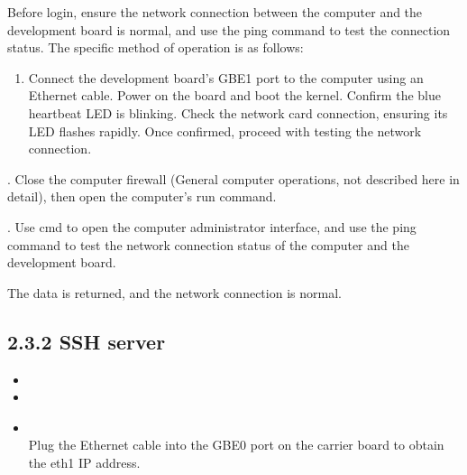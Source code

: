 \documentclass[letterpaper,10pt,openany,english]{sphinxmanual}
\begin{document}
\sphinxAtStartPar
Before login, ensure the network connection between the computer and the development board is normal, and use the ping command to test the connection status. The specific method of operation is as follows:
\begin{enumerate}
%
\item {} 
\sphinxAtStartPar
Connect the development board’s GBE1 port to the computer using an Ethernet cable. Power on the board and boot the kernel. Confirm the blue heartbeat LED is blinking. Check the network card connection, ensuring its LED flashes rapidly. Once confirmed, proceed with testing the network connection.

\end{enumerate}

. Close the computer firewall (General computer operations, not described here in detail), then open the computer’s run command.

\sphinxAtStartPar
{}

. Use cmd to open the computer administrator interface, and use the ping command to test the network connection status of the computer and the development board.

\sphinxAtStartPar
{}

\sphinxAtStartPar
The data is returned, and the network connection is normal.


\subsection{2.3.2 SSH server}
\label{\detokenize{linux-manual:ssh-server}}
\sphinxAtStartPar
{}
\begin{itemize}
\item {} 
\sphinxAtStartPar
{}

\item {} 
\sphinxAtStartPar
{}

\item {} 
\sphinxAtStartPar
{}\\
Plug the Ethernet cable into the GBE0 port on the carrier board to obtain the eth1 IP address.

\end{itemize}
\end{document}
